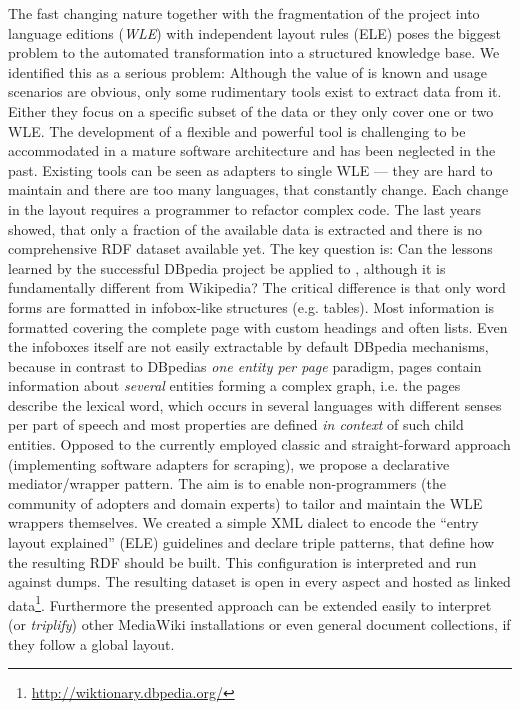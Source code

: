 The fast changing nature together with the fragmentation of the project into  \wik language editions (\textit{WLE}) with independent layout rules (ELE) poses the biggest problem to the automated transformation into a structured knowledge base.
We identified this as a serious problem:
Although the value of \wik is known and usage scenarios are obvious, only some rudimentary tools exist to extract data from it.
Either they focus on a specific subset of the data or they only cover one or two WLE.
The development of a flexible and powerful tool is challenging to be accommodated in a mature software architecture and has been neglected in the past.
Existing tools can be seen as adapters to single WLE --- they are hard to maintain and there are too many languages, that constantly change. 
Each change in the \wik layout requires a programmer to refactor complex code. 
The last years showed, that only a fraction of the available data is extracted and there is no comprehensive RDF dataset available yet. 
The key question is: 
Can the lessons learned by the successful DBpedia project be applied to \wik, although it is fundamentally different from Wikipedia? 
The critical difference is that only word forms are formatted in infobox-like structures (e.g. tables).
Most information is formatted covering the complete page with custom headings and often lists. 
Even the infoboxes itself are not easily extractable by default DBpedia mechanisms, because in contrast to DBpedias \textit{one entity per page} paradigm, \wik pages contain information about \textit{several} entities forming a complex graph, i.e. the pages describe the lexical word, which occurs in several languages with different senses per part of speech and most properties are defined \textit{in context} of such child entities.
Opposed to the currently employed classic and straight-forward approach (implementing software adapters for scraping), we propose a declarative mediator/wrapper pattern. 
The aim is to enable non-programmers (the community of adopters and domain experts) to tailor and maintain the WLE wrappers themselves. 
We created a simple XML dialect to encode the ``entry layout explained'' (ELE) guidelines and declare triple patterns, that define how the resulting RDF should be built. 
This configuration is interpreted and run against \wik dumps. 
The resulting dataset is open in every aspect and hosted as linked data\footnote{\url{http://wiktionary.dbpedia.org/}}. 
Furthermore the presented approach can be extended easily to interpret (or \textit{triplify}) other MediaWiki installations or even general document collections, if they follow a global layout.


